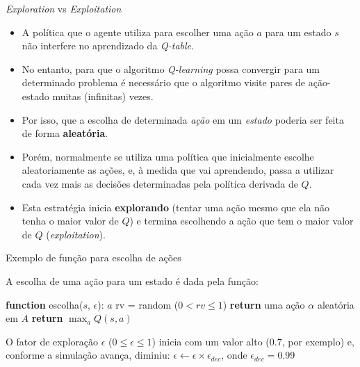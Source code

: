 \documentclass{beamer}
\begin{document}
\begin{frame}{\textit{Exploration} vs \textit{Exploitation}}
	\begin{itemize}
		\item<1-> A política que o agente utiliza para escolher 
		uma ação $a$ para um estado $s$ não interfere no aprendizado 
		da \textit{Q-table}.
		\item<2-> No entanto, para que o algoritmo \textit{Q-learning} possa convergir 
		para um determinado problema é necessário que o algoritmo visite pares de 
		ação-estado muitas (infinitas) vezes.
		\item<3-> Por isso, que a escolha de determinada \textit{ação} em um \textit{estado} 
		poderia ser feita de forma \textbf{aleatória}. 
		
		\item<4-> Porém, normalmente se utiliza uma política que inicialmente escolhe 
		aleatoriamente as ações, e, à medida que vai aprendendo, passa a utilizar cada 
		vez mais as decisões determinadas pela política derivada de $Q$. 
		
		\item<5-> Esta estratégia inicia \textbf{explorando} (tentar uma ação mesmo que ela não 
		tenha o maior valor de $Q$) e termina escolhendo a ação que tem o 
		maior valor de $Q$ (\textit{exploitation}).  
		
	\end{itemize}
\end{frame}


\begin{frame}{Exemplo de função para escolha de ações}
	
	A escolha de uma ação para um estado é dada pela função:
	
	\vspace{0.3cm}
	
	\begin{algorithmic} 
		\STATE \textbf{function} escolha($s$, $\epsilon$): $a$
		\STATE rv = random ($0 < rv \leq 1$)
		\STATE \textbf{return} uma ação $\alpha$ aleatória em $A$
		\ENDIF   
		\STATE \textbf{return} $\max_{a}{Q(s, a)} $
	\end{algorithmic}

	\vspace{0.3cm}
	
	O fator de exploração $\epsilon$ ($0 \leq \epsilon \leq 1$) inicia com um valor 
	alto ($0.7$, por exemplo) e, conforme a simulação avança, 
	diminiu: $\epsilon \leftarrow \epsilon \times \epsilon_{dec}$, 
	onde $\epsilon_{dec} = 0.99$
	
\end{frame}
\end{document}
